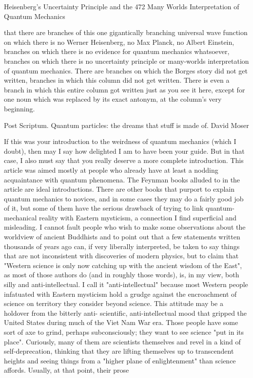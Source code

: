 Heisenberg's Uncertainty Principle and the                                           472
Many Worlds Interpretation of Quantum Mechanics

that there are branches of this one gigantically branching universal wave function on
which there is no Werner Heisenberg, no Max Planck, no Albert Einstein, branches on
which there is no evidence for quantum mechanics whatsoever, branches on which
there is no uncertainty principle or many-worlds interpretation of quantum mechanics.
There are branches on which the Borges story did not get written, branches in which
this column did not get written. There is even a branch in which this entire column got
written just as you see it here, except for one noun which was replaced by its exact
antonym, at the column's very beginning.

Post Scriptum.
                                   Quantum particles: the dreams that stuff is made of.
                                                                         David Moser

         If this was your introduction to the weirdness of quantum mechanics (which I
doubt), then may I say how delighted I am to have been your guide. But in that case, I
also must say that you really deserve a more complete introduction. This article was
aimed mostly at people who already have at least a nodding acquaintance with
quantum phenomena. The Feynman books alluded to in the article are ideal
introductions. There are other books that purport to explain quantum mechanics to
novices, and in some cases they may do a fairly good job of it, but some of them have
the serious drawback of trying to link quantum-mechanical reality with Eastern
mysticism, a connection I find superficial and misleading. I cannot fault people who
wish to make some observations about the worldview of ancient Buddhists and to
point out that a few statements written thousands of years ago can, if very liberally
interpreted, be taken to say things that are not inconsistent with discoveries of modern
physics, but to claim that "Western science is only now catching up with the ancient
wisdom of the East", as most of those authors do (and in roughly those words), is, in
my view, both silly and anti-intellectual.
         I call it "anti-intellectual" because most Western people infatuated with
Eastern mysticism hold a grudge against the encroachment of science on territory they
consider beyond science. This attitude may be a holdover from the bitterly anti-
scientific, anti-intellectual mood that gripped the United States during much of the
Viet Nam War era. Those people have some sort of axe to grind, perhaps
subconsciously; they want to see science "put in its place". Curiously, many of them
are scientists themselves and revel in a kind of self-deprecation, thinking that they are
lifting themselves up to transcendent heights and seeing things from a "higher plane
of enlightenment" than science affords. Usually, at that point, their prose




